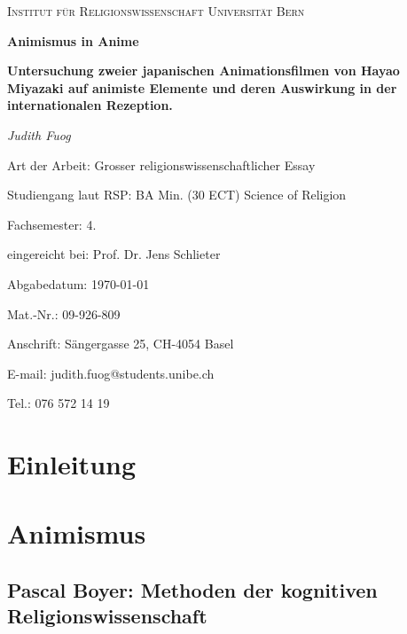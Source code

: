 \documentclass[a4paper]{article}
\begin{document}
\begin{titlepage}
	\begin{center}
	{\scshape\LARGE Institut für Religionswissenschaft Universität Bern \par}
	\vspace{1cm}
	{\huge\bfseries Animismus in Anime\par}
	{\large\bfseries Untersuchung zweier japanischen Animationsfilmen von Hayao Miyazaki auf animiste Elemente und deren Auswirkung in der internationalen Rezeption.\par}
	\vspace{2cm}
	{\Large\itshape Judith Fuog\par}
	\vfill
	\end{center}

\begin{minipage}{\textwidth}
	\begin{large}
	Art der Arbeit: Grosser religionswissenschaftlicher Essay\par
	Studiengang laut RSP: BA Min. (30 ECT) Science of Religion\par
	Fachsemester: 4.\par
	\hfill

	eingereicht bei: Prof. Dr. Jens Schlieter\par
	Abgabedatum: \today\par
	\hfill

	Mat.-Nr.: 09-926-809\par
	Anschrift: Sängergasse 25, CH-4054 Basel\par
	E-mail: judith.fuog@students.unibe.ch\par
	Tel.: 076 572 14 19\par
	\end{large}
\end{minipage}
\hfill
\end{titlepage}
\newpage
\tableofcontents
\newpage

\section*{Einleitung}


\section{Animismus}

\subsection{Pascal Boyer: Methoden der kognitiven Religionswissenschaft}

\end{document}
